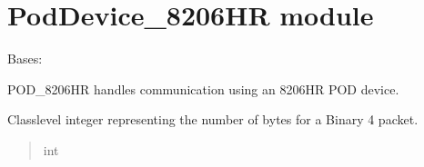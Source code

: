 \documentclass[letterpaper,10pt,english]{sphinxmanual}
\begin{document}
\sphinxstepscope


\section{PodDevice\_8206HR module}
\label{\detokenize{PodDevice_8206HR:module-PodDevice_8206HR}}\label{\detokenize{PodDevice_8206HR:poddevice-8206hr-module}}\label{\detokenize{PodDevice_8206HR::doc}}

\begin{fulllineitems}
\label{\detokenize{PodDevice_8206HR:PodDevice_8206HR.POD_8206HR}}
\pysigstartsignatures
{}
\pysigstopsignatures
\sphinxAtStartPar
Bases: {\hyperref[\detokenize{BasicPodProtocol:BasicPodProtocol.POD_Basics}]{}}

\sphinxAtStartPar
POD\_8206HR handles communication using an 8206HR POD device.

\begin{fulllineitems}
\label{\detokenize{PodDevice_8206HR:PodDevice_8206HR.POD_8206HR.__B4LENGTH}}
\pysigstartsignatures
{}
\pysigstopsignatures
\sphinxAtStartPar
Class\sphinxhyphen{}level integer representing the number of bytes for a Binary 4 packet.
\begin{quote}\begin{description}
\sphinxAtStartPar
int

\end{description}\end{quote}


\end{fulllineitems}
\end{fulllineitems}
\end{document}
